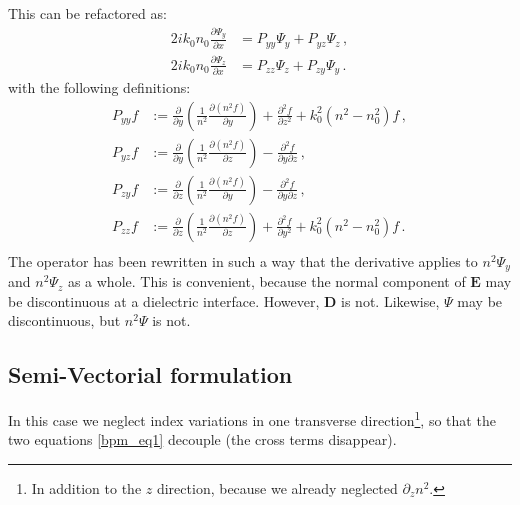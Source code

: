 \documentclass[]{article}
\begin{document}
	This can be refactored as:
	\begin{subequations}
		\begin{align}
			2i k_0 n_0 \frac{\partial \Psi_y}{\partial x} &= P_{yy} \Psi_y+P_{yz} \Psi_z \, ,\\
			2i k_0 n_0 \frac{\partial \Psi_z}{\partial x} &= P_{zz} \Psi_z+P_{zy} \Psi_y \, .
		\end{align}
		\label{bpm_eq1}
	\end{subequations}
	with the following definitions:
	\begin{subequations}
		\begin{align}
			P_{yy} f &:= \frac{\partial}{\partial y}\left(\frac{1}{n^2}\frac{\partial (n^2 f)}{\partial y}  \right)+\frac{\partial^2 f}{\partial z^2}+k_0^2(n^2-n_0^2)f\, , \\
			P_{yz} f &:= \frac{\partial}{\partial y}\left(\frac{1}{n^2}\frac{\partial (n^2 f)}{\partial z}  \right) - \frac{\partial^2 f}{\partial y \partial z}\, ,\\
			P_{zy} f &:= \frac{\partial}{\partial z}\left(\frac{1}{n^2}\frac{\partial (n^2 f)}{\partial y}  \right) - \frac{\partial^2 f}{\partial y \partial z}\, ,\\
			P_{zz} f &:= \frac{\partial}{\partial z}\left(\frac{1}{n^2}\frac{\partial (n^2 f)}{\partial z}  \right)+\frac{\partial^2 f}{\partial y^2}+k_0^2(n^2-n_0^2)f\, .\\
		\end{align}
	\end{subequations}
	The operator has been rewritten in such a way that the derivative applies to $n^2 \Psi_y$ and $n^2 \Psi_z$ as a whole. This is convenient, because the normal component of $\textbf{E}$ may be discontinuous at a dielectric interface. However, $\textbf{D}$ is not. Likewise, $\Psi$ may be discontinuous, but $n^2 \Psi$ is not.
	
	\subsection{Semi-Vectorial formulation}
	In this case we neglect index variations in one transverse direction\footnote{In addition to the $z$ direction, because we already neglected $\partial_z n^2$.}, so that the two equations \eqref{bpm_eq1} decouple (the cross terms disappear). 
		
\end{document}
